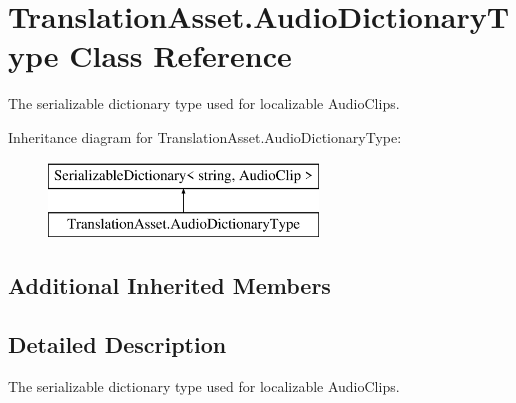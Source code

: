 \hypertarget{class_translation_asset_1_1_audio_dictionary_type}{}\section{Translation\+Asset.\+Audio\+Dictionary\+Type Class Reference}
\label{class_translation_asset_1_1_audio_dictionary_type}


The serializable dictionary type used for localizable Audio\+Clips.  


Inheritance diagram for Translation\+Asset.\+Audio\+Dictionary\+Type\+:\begin{figure}[H]
\begin{center}
\leavevmode
\includegraphics[height=2.000000cm]{class_translation_asset_1_1_audio_dictionary_type}
\end{center}
\end{figure}
\subsection*{Additional Inherited Members}


\subsection{Detailed Description}
The serializable dictionary type used for localizable Audio\+Clips. 

